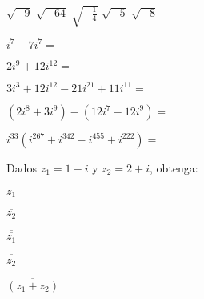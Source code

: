 \message{ !name(Guia-Formativa-1-3TP-Numeros-Complejos.tex)}\documentclass[twocolumns,12pt,addpoints,x11names]{exam}
\begin{document}
\begin{questions}

\question $\sqrt{-9}$
  \answerline
  \question $\sqrt{-64}$
  \answerline
  \question $\sqrt{-\frac{1}{4}}$
  \answerline
  \question $\sqrt{-5}$
  \answerline
  \question $\sqrt{-8}$
  \answerline
 



\question $i^7-7i^7=$
  \answerline

\question $2i^9+12i^{12}=$
  \answerline

\question $3i^3+12i^{12}-21i^{21}+11i^{11}=$
  \answerline

\question $(2i^8+3i^9)-(12i^7-12i^9)=$
  \answerline

\question $i^{33}(i^{267}+i^{342}-i^{455}+i^{222})=$
  \answerline

\newpage


\twocolumn
{}

Dados $z_1=1-i$ y $z_2=2+i$, obtenga:


\question $\overline{z_1}$
   \begin{solutionbox}{1in}
    
  \end{solutionbox}

\question $\overline{z_2}$
   \begin{solutionbox}{1in}
    
  \end{solutionbox}

\question $\overline{\overline{z_1}}$
   \begin{solutionbox}{1in}
    
  \end{solutionbox}

\question $\overline{\overline{z_2}}$
   \begin{solutionbox}{1in}
    
  \end{solutionbox}

\question $\overline{(z_1+z_2)}$
   \begin{solutionbox}{1in}
    
  \end{solutionbox}

\vspace{3cm}
  

\end{questions}
\end{document}
